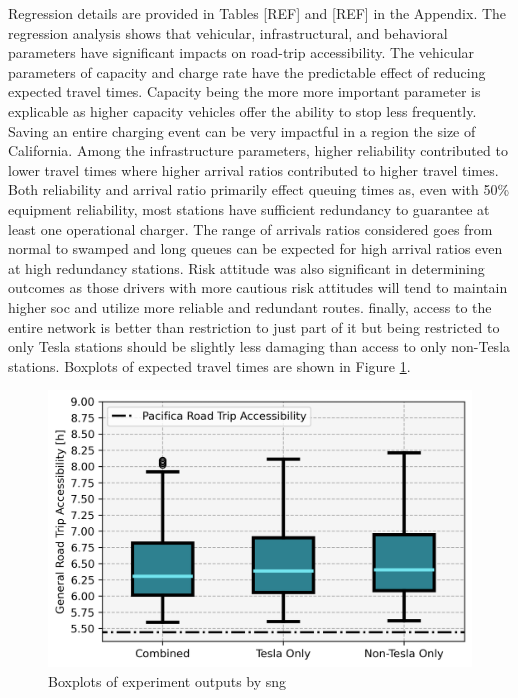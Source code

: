 \documentclass[11pt]{article}
\begin{document}
\begin{multicols}{2}
Regression details are provided in Tables [REF] and [REF] in the Appendix. The regression analysis shows that vehicular, infrastructural, and behavioral parameters have significant impacts on road-trip accessibility. The vehicular parameters of capacity and charge rate have the predictable effect of reducing expected travel times. Capacity being the more more important parameter is explicable as higher capacity vehicles offer the ability to stop less frequently. Saving an entire charging event can be very impactful in a region the size of California. Among the infrastructure parameters, higher reliability contributed to lower travel times where higher arrival ratios contributed to higher travel times. Both reliability and arrival ratio primarily effect queuing times as, even with 50\% equipment reliability, most stations have sufficient redundancy to guarantee at least one operational charger. The range of arrivals ratios considered goes from normal to swamped and long queues can be expected for high arrival ratios even at high redundancy stations. Risk attitude was also significant in determining outcomes as those drivers with more cautious risk attitudes will tend to maintain higher \gls{soc} and utilize more reliable and redundant routes. finally, access to the entire network is better than restriction to just part of it but being restricted to only Tesla stations should be slightly less damaging than access to only non-Tesla stations. Boxplots of expected travel times are shown in Figure \ref{fig:networks_boxplots}.

\begin{figure}[H]
	\centering
	\includegraphics[width = \linewidth]{figs/Networks_Boxplots_RTA.png}
	\caption{Boxplots of experiment outputs by \gls{sng}}
	\label{fig:networks_boxplots}
\end{figure}


\end{multicols}
\end{document}

